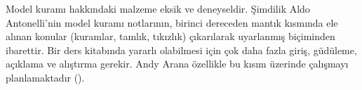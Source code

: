 


\begin{editorial}
  Model kuramı hakkındaki malzeme eksik ve deneyseldir. Şimdilik Aldo
  Antonelli'nin model kuramı notlarının, birinci dereceden mantık
  kısmında ele alınan konular (kuramlar, tamlık, tıkızlık) çıkarılarak
  uyarlanmış biçiminden ibarettir. Bir ders kitabında yararlı olabilmesi
  için çok daha fazla giriş, güdüleme, açıklama ve alıştırma gerekir.
  Andy Arana özellikle bu kısım üzerinde çalışmayı planlamaktadır
  ().
\end{editorial}





\OLEndPartHook

